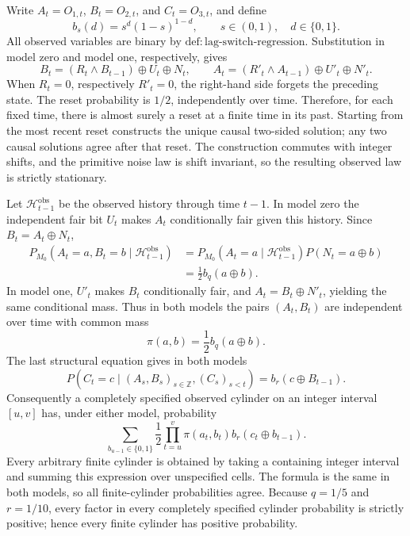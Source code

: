 Write \(A_t=O_{1,t}\), \(B_t=O_{2,t}\), and \(C_t=O_{3,t}\), and define
\[
 b_s(d)=s^d(1-s)^{1-d},\qquad s\in(0,1),\quad d\in\{0,1\}.
\]
All observed variables are binary by \(\mathrm{def:lag\text{-}switch\text{-}regression}\).  Substitution in model zero and model one, respectively, gives
\[
 B_t=(R_t\wedge B_{t-1})\oplus U_t\oplus N_t,
 \qquad
 A_t=(R'_t\wedge A_{t-1})\oplus U'_t\oplus N'_t.
\]
When \(R_t=0\), respectively \(R'_t=0\), the right-hand side forgets the preceding state.  The reset probability is \(1/2\), independently over time.  Therefore, for each fixed time, there is almost surely a reset at a finite time in its past.  Starting from the most recent reset constructs the unique causal two-sided solution; any two causal solutions agree after that reset.  The construction commutes with integer shifts, and the primitive noise law is shift invariant, so the resulting observed law is strictly stationary.

Let \(\mathcal H^{\mathrm{obs}}_{t-1}\) be the observed history through time \(t-1\).  In model zero the independent fair bit \(U_t\) makes \(A_t\) conditionally fair given this history.  Since \(B_t=A_t\oplus N_t\),
\[
 \begin{aligned}
 P_{M_0}(A_t=a,B_t=b\mid\mathcal H^{\mathrm{obs}}_{t-1})
 &=P_{M_0}(A_t=a\mid\mathcal H^{\mathrm{obs}}_{t-1})P(N_t=a\oplus b)\\
 &=\frac12 b_q(a\oplus b).
 \end{aligned}
\]
In model one, \(U'_t\) makes \(B_t\) conditionally fair, and \(A_t=B_t\oplus N'_t\), yielding the same conditional mass.  Thus in both models the pairs \((A_t,B_t)\) are independent over time with common mass
\[
 \pi(a,b)=\frac12 b_q(a\oplus b).
\]
The last structural equation gives in both models
\[
 P(C_t=c\mid(A_s,B_s)_{s\in\mathbb Z},(C_s)_{s<t})
 =b_r(c\oplus B_{t-1}).
\]
Consequently a completely specified observed cylinder on an integer interval \([u,v]\) has, under either model, probability
\[
 \sum_{b_{u-1}\in\{0,1\}}\frac12
 \prod_{t=u}^{v}\pi(a_t,b_t)b_r(c_t\oplus b_{t-1}).
\]
Every arbitrary finite cylinder is obtained by taking a containing integer interval and summing this expression over unspecified cells.  The formula is the same in both models, so all finite-cylinder probabilities agree.  Because \(q=1/5\) and \(r=1/10\), every factor in every completely specified cylinder probability is strictly positive; hence every finite cylinder has positive probability.

